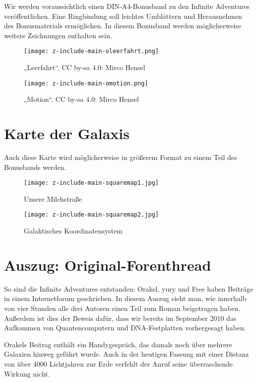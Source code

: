 Wir werden voraussichtlich einen DIN-A4-Bonusband zu den Infinite Adventures veröffentlichen. Eine Ringbindung soll leichtes Umblättern und Herausnehmen des Bonusmaterials ermöglichen. In diesem Bonusband werden möglicherweise weitere Zeichnungen enthalten sein.

\begin{figure}[p]
    \texttt{[image: z-include-main-oleerfahrt.png]}
    \caption{„Leerfahrt“. CC by-sa 4.0: Mirco Hensel}
\end{figure}

\begin{figure}[p]
    \texttt{[image: z-include-main-omotion.png]}
    \caption{„Motion“. CC by-sa 4.0: Mirco Hensel}
\end{figure}


\chapter{Karte der Galaxis}

Auch diese Karte wird möglicherweise in größerem Format zu einem Teil des Bonusbands werden.

\begin{figure}[p]
    \texttt{[image: z-include-main-squaremap1.jpg]}
    \caption{Unsere Milchstraße}
\end{figure}

\begin{figure}[p]
    \texttt{[image: z-include-main-squaremap2.jpg]}
    \caption{Galaktisches Koordinatensystem}
\end{figure}


\chapter{Auszug: Original-Forenthread}

So sind die Infinite Adventures entstanden: Orakel, yury und Free haben Beiträge in einem Internetforum geschrieben. In diesem Auszug sieht man, wie innerhalb von vier Stunden alle drei Autoren einen Teil zum Roman beigetragen haben. Außerdem ist dies der Beweis dafür, dass wir bereits im September 2010 das Aufkommen von Quantencomputern und DNA-Festplatten vorhergesagt haben.

Orakels Beitrag enthält ein Handygespräch, das damals noch über mehrere Galaxien hinweg geführt wurde. Auch in der heutigen Fassung mit einer Distanz von über 4000 Lichtjahren zur Erde verfehlt der Anruf seine überraschende Wirkung nicht.

